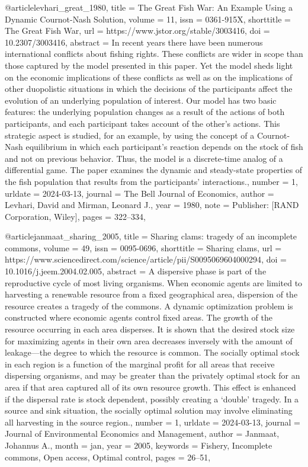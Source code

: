 {{{{@article{levhari_great_1980,
	title = {The {Great} {Fish} {War}: {An} {Example} {Using} a {Dynamic} {Cournot}-{Nash} {Solution}},
	volume = {11},
	issn = {0361-915X},
	shorttitle = {The {Great} {Fish} {War}},
	url = {https://www.jstor.org/stable/3003416},
	doi = {10.2307/3003416},
	abstract = {In recent years there have been numerous international conflicts about fishing rights. These conflicts are wider in scope than those captured by the model presented in this paper. Yet the model sheds light on the economic implications of these conflicts as well as on the implications of other duopolistic situations in which the decisions of the participants affect the evolution of an underlying population of interest. Our model has two basic features: the underlying population changes as a result of the actions of both participants, and each participant takes account of the other's actions. This strategic aspect is studied, for an example, by using the concept of a Cournot-Nash equilibrium in which each participant's reaction depends on the stock of fish and not on previous behavior. Thus, the model is a discrete-time analog of a differential game. The paper examines the dynamic and steady-state properties of the fish population that results from the participants' interactions.},
	number = {1},
	urldate = {2024-03-13},
	journal = {The Bell Journal of Economics},
	author = {Levhari, David and Mirman, Leonard J.},
	year = {1980},
	note = {Publisher: [RAND Corporation, Wiley]},
	pages = {322--334},
}

@article{janmaat_sharing_2005,
	title = {Sharing clams: tragedy of an incomplete commons},
	volume = {49},
	issn = {0095-0696},
	shorttitle = {Sharing clams},
	url = {https://www.sciencedirect.com/science/article/pii/S0095069604000294},
	doi = {10.1016/j.jeem.2004.02.005},
	abstract = {A dispersive phase is part of the reproductive cycle of most living organisms. When economic agents are limited to harvesting a renewable resource from a fixed geographical area, dispersion of the resource creates a tragedy of the commons. A dynamic optimization problem is constructed where economic agents control fixed areas. The growth of the resource occurring in each area disperses. It is shown that the desired stock size for maximizing agents in their own area decreases inversely with the amount of leakage—the degree to which the resource is common. The socially optimal stock in each region is a function of the marginal profit for all areas that receive dispersing organisms, and may be greater than the privately optimal stock for an area if that area captured all of its own resource growth. This effect is enhanced if the dispersal rate is stock dependent, possibly creating a ‘double’ tragedy. In a source and sink situation, the socially optimal solution may involve eliminating all harvesting in the source region.},
	number = {1},
	urldate = {2024-03-13},
	journal = {Journal of Environmental Economics and Management},
	author = {Janmaat, Johannus A.},
	month = jan,
	year = {2005},
	keywords = {Fishery, Incomplete commons, Open access, Optimal control},
	pages = {26--51},
}

}}}}
